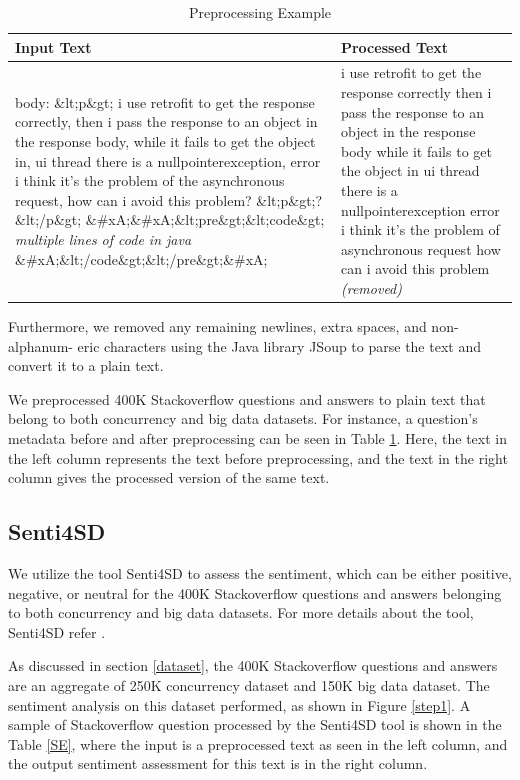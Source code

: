 \begin{table}[b!ht]
\caption{Preprocessing Example}
\label{tab:example}
\centering
\begin{tabular} {p{3in}p{2.5in}}\hline
\textbf{Input Text} & \textbf{Processed Text} \\ \hline

body: \&lt;p\&gt; i use retrofit to get the response correctly, then i pass the response to an object in the response body, while it fails to get the object in, ui thread there is a nullpointerexception, error i think it's the problem of the asynchronous request, how can i avoid this problem? \&lt;p\&gt;?\&lt;/p\&gt; \&\#xA;\&\#xA;\&lt;pre\&gt;\&lt;code\&gt; \emph{multiple lines of code in java} \&\#xA;\&lt;/code\&gt;\&lt;/pre\&gt;\&\#xA;
&
i use retrofit to get the response correctly then i pass the response to an object in the response body while it fails to get the object in ui thread there is a nullpointerexception error i think it's the problem of asynchronous request how can i avoid this problem \emph{(removed)} \\ \hline
\end{tabular}
\end{table}

Furthermore, we removed any remaining newlines, extra spaces, and non-alphanum- eric characters using the Java library JSoup to parse the text and convert it to a plain text.

We preprocessed 400K Stackoverflow questions and answers to plain text that belong to both concurrency and big data datasets. For instance, a question's metadata before and after preprocessing can be seen in Table \ref{tab:example}. Here, the text in the left column represents the text before preprocessing, and the text in the right column gives the processed version of the same text.

\subsection{Senti4SD}

We utilize the tool Senti4SD to assess the sentiment, which can be either positive, negative, or neutral for the 400K Stackoverflow questions and answers belonging to both concurrency and big data datasets. For more details about the tool, Senti4SD refer \cite{calefato2018sentiment}. 

As discussed in section \ref{dataset}, the 400K Stackoverflow questions and answers are an aggregate of 250K concurrency dataset and 150K big data dataset. The sentiment analysis on this dataset performed, as shown in Figure \ref{step1}. A sample of Stackoverflow question processed by the Senti4SD tool is shown in the Table \ref{SE}, where the input is a preprocessed text as seen in the left column, and the output sentiment assessment for this text is in the right column.



